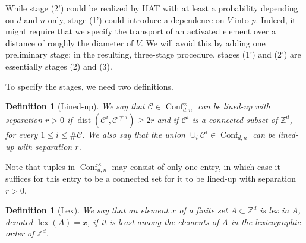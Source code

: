 \documentclass[11pt,reqno]{amsart}
\newtheorem{definition}[lemma]{Definition}
\theoremstyle{definition}
\numberwithin{equation}{section}
\newcommand{\Z}{\mathbb{Z}}
\newcommand{\1}{\mathbf{1}}
\DeclareMathOperator{\dist}{dist}
\DeclareMathOperator{\lex}{lex}
\newcommand{\CC}{\mathcal{C}}
\DeclareMathOperator{\Conf}{\mathrm{Conf}}
\begin{document}
While stage (2') could be realized by HAT with at least a probability depending on $d$ and $n$ only, stage (1') could introduce a dependence on $V$ into $p$. Indeed, it might require that we specify the transport of an activated element over a distance of roughly the diameter of $V$. We will avoid this by adding one preliminary stage; in the resulting, three-stage procedure, stages (1') and (2') are essentially stages (2) and (3).


To specify the stages, we need two definitions.

\begin{definition}[Lined-up]\label{def lined up}
We say that $\CC \in \Conf_{d,n}^\times$ can be lined-up with separation $r > 0$ if $\dist(\CC^i, \CC^{\neq i}) \geq 2r$ and if $\CC^i$ is a connected subset of $\Z^d$, for every $1 \leq i \leq \#\CC$. We also say that the union $\cup_i \CC^i \in \Conf_{d,n}$ can be lined-up with separation $r$.
\end{definition}

Note that tuples in $\Conf_{d,n}^\times$ may consist of only one entry, in which case it suffices for this entry to be a connected set for it to be lined-up with separation $r > 0$. 

\begin{definition}[Lex]
We say that an element $x$ of a finite set $A \subset \Z^d$ is lex in $A$, denoted $\lex (A) = x$, if it is least among the elements of $A$ in the lexicographic order of $\Z^d$.
\end{definition}
\end{document}
